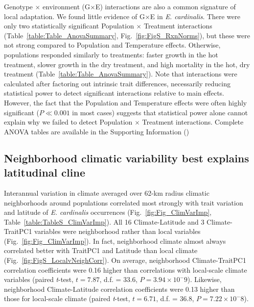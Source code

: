\documentclass[11pt, oneside]{article}
\begin{document}
Genotype $\times$ environment (G$\times$E) interactions are also a common signature of local adaptation. We found little evidence of G$\times$E in \textit{E. cardinalis}. There were only two statistically significant Population $\times$ Treatment interactions (Table~\ref{table:Table_AnovaSummary}, Fig.~\ref{fig:FigS_RxnNorms}), but these were not strong compared to Population and Temperature effects. Otherwise, populations responded similarly to treatments: faster growth in the hot treatment, slower growth in the dry treatment, and high mortality in the hot, dry treatment (Table~\ref{table:Table_AnovaSummary}). Note that interactions were calculated after factoring out intrinsic trait differences, necessarily reducing statistical power to detect significant interactions relative to main effects. However, the fact that the Population and Temperature effects were often highly significant ($P \ll 0.001$ in most cases) suggests that statistical power alone cannot explain why we failed to detect Population $\times$ Treatment interactions. Complete ANOVA tables are available in the Supporting Information ()

\subsection*{Neighborhood climatic variability best explains latitudinal cline}

Interannual variation in climate averaged over 62-km radius climatic neighborhoods around populations correlated most strongly with trait variation and latitude of \textit{E. cardinalis} occurrences (Fig.~\ref{fig:Fig_ClimVarImp}, Table~\ref{table:TableS_ClimVarImp}). All 16 Climate-Latitude and 3 Climate-TraitPC1 variables were neighborhood rather than local variables (Fig.~\ref{fig:Fig_ClimVarImp}). In fact, neighborhood climate almost always correlated better with TraitPC1 and Latitude than local climate (Fig.~\ref{fig:FigS_LocalvNeighCorr}). On average, neighborhood Climate-TraitPC1 correlation coefficients were 0.16 higher than correlations with local-scale climate variables (paired \textit{t}-test, $t = 7.87$, d.f. = 33.6, $P = 3.94 \times 10 ^ -9$). Likewise, neighborhood Climate-Latitude correlation coefficients were 0.13 higher than those for local-scale climate (paired \textit{t}-test, $t = 6.71$, d.f. = 36.8, $P = 7.22 \times 10 ^ -8$). 
\end{document}
